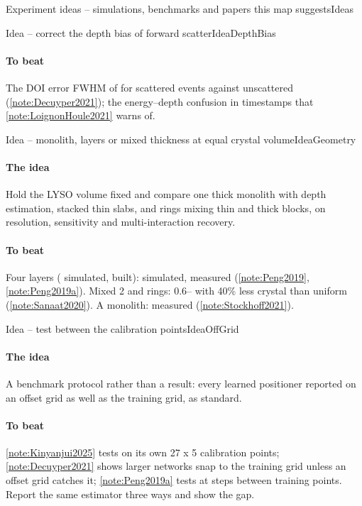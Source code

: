 \begin{programnote}{Experiment ideas -- simulations, benchmarks and papers this map suggests}{Ideas}
\begin{papernote}{Idea -- correct the depth bias of forward scatter}{IdeaDepthBias}
\paragraph{To beat}
The DOI error FWHM of  for scattered events against 
unscattered (\ref{note:Decuyper2021}); the energy--depth confusion in
timestamps that \ref{note:LoignonHoule2021} warns of.
\end{papernote}

\begin{papernote}{Idea -- monolith, layers or mixed thickness at equal crystal volume}{IdeaGeometry}
\paragraph{The idea}
Hold the LYSO volume fixed and compare one thick monolith with depth
estimation, stacked thin slabs, and rings mixing thin and thick blocks, on
resolution, sensitivity and multi-interaction recovery.

\paragraph{To beat}
Four layers ( simulated,  built):  simulated,
 measured
(\ref{note:Peng2019}, \ref{note:Peng2019a}). Mixed 2 and  rings:
0.6-- with 40\% less crystal than uniform 
(\ref{note:Sanaat2020}). A  monolith:  measured
(\ref{note:Stockhoff2021}).
\end{papernote}

\begin{papernote}{Idea -- test between the calibration points}{IdeaOffGrid}
\paragraph{The idea}
A benchmark protocol rather than a result: every learned positioner reported
on an offset grid as well as the training grid, as standard.

\paragraph{To beat}
\ref{note:Kinyanjui2025} tests on its own 27 x 5 calibration points;
\ref{note:Decuyper2021} shows larger networks snap to the training grid unless
an offset grid catches it; \ref{note:Peng2019a} tests at  steps
between  training points. Report the same estimator three ways and show
the gap.
\end{papernote}


\end{programnote}
